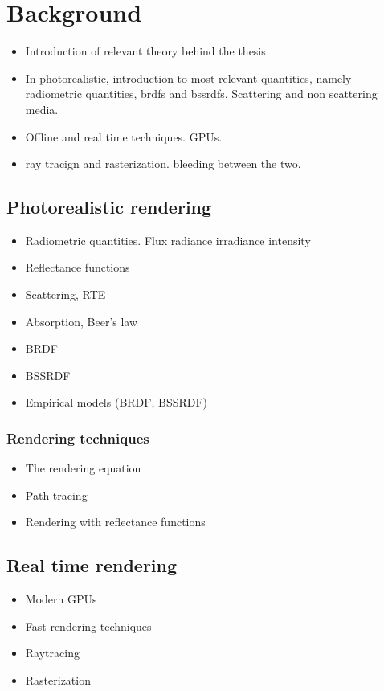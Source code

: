 \chapter{Background}
\begin{itemize}
\item Introduction of relevant theory behind the thesis
\item In photorealistic, introduction to most relevant quantities, namely radiometric quantities, brdfs and bssrdfs. Scattering and non scattering media.
\item Offline and real time techniques. GPUs. 
\item ray tracign and rasterization. bleeding between the two.
\end{itemize}

\section{Photorealistic rendering}

\begin{itemize}
\item Radiometric quantities. Flux radiance irradiance intensity
\item Reflectance functions
\item Scattering, RTE
\item Absorption, Beer's law
\item BRDF
\item BSSRDF
\item Empirical models (BRDF, BSSRDF)
\end{itemize}

\subsection{Rendering techniques}
\begin{itemize}
\item The rendering equation
\item Path tracing
\item Rendering with reflectance functions
\end{itemize}

\section{Real time rendering} 
\begin{itemize}
\item Modern GPUs
\item Fast rendering techniques
\item Raytracing 
\item Rasterization
\end{itemize}
                                                                                                                                                                                                                                         
